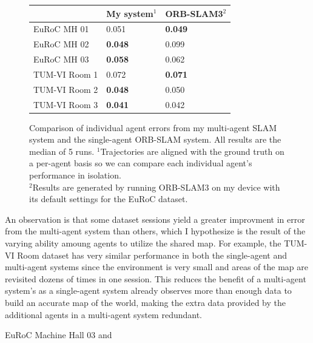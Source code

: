 \begin{figure}[h]
    \centering
    \def\arraystretch{1.2}
    \begin{tabular}{ |l|l|l| }
        \cline{2-3}
        \multicolumn{1}{c|}{} & My system$^1$  & ORB-SLAM3$^2$  \\
        \hline
        EuRoC MH 01           & 0.051          & \textbf{0.049} \\
        EuRoC MH 02           & \textbf{0.048} & 0.099          \\
        EuRoC MH 03           & \textbf{0.058} & 0.062          \\
        \hline
        TUM-VI Room 1         & 0.072          & \textbf{0.071} \\
        TUM-VI Room 2         & \textbf{0.048} & 0.050          \\
        TUM-VI Room 3         & \textbf{0.041} & 0.042          \\
        \hline
    \end{tabular}

    \caption{Comparison of individual agent errors from my multi-agent SLAM system and the single-agent ORB-SLAM system. All results are the median of 5 runs. \captionbreak $^1$Trajectories are aligned with the ground truth on a per-agent basis so we can compare each individual agent's performance in isolation. \\ $^2$Results are generated by running ORB-SLAM3 on my device with its default settings for the EuRoC dataset.}
    \label{fig:comparison-to-single-agent-systems}
\end{figure}

An observation is that some dataset sessions yield a greater improvment in error from the multi-agent system than others, which I hypothesize is the result of the varying ability amoung agents to utilize the shared map. For example, the TUM-VI Room dataset has very similar performance in both the single-agent and multi-agent systems since the environment is very small and areas of the map are revisited dozens of times in one session. This reduces the benefit of a multi-agent system's as a single-agent system already observes more than enough data to build an accurate map of the world, making the extra data provided by the additional agents in a multi-agent system redundant.

EuRoC Machine Hall 03 and

